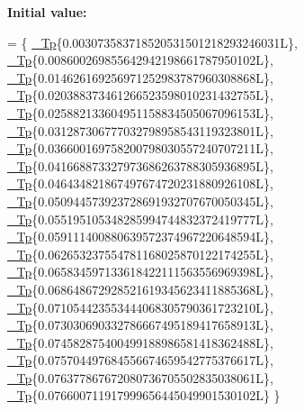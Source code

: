 {\bfseries Initial value\+:}
\begin{DoxyCode}
=
      \{
        \hyperlink{namespace____gnu__cxx_a3b19a9c800ca194374ef9172290f7d79}{\_Tp}\{0.003073583718520531501218293246031L\},
        \hyperlink{namespace____gnu__cxx_a3b19a9c800ca194374ef9172290f7d79}{\_Tp}\{0.008600269855642942198661787950102L\},
        \hyperlink{namespace____gnu__cxx_a3b19a9c800ca194374ef9172290f7d79}{\_Tp}\{0.014626169256971252983787960308868L\},
        \hyperlink{namespace____gnu__cxx_a3b19a9c800ca194374ef9172290f7d79}{\_Tp}\{0.020388373461266523598010231432755L\},
        \hyperlink{namespace____gnu__cxx_a3b19a9c800ca194374ef9172290f7d79}{\_Tp}\{0.025882133604951158834505067096153L\},
        \hyperlink{namespace____gnu__cxx_a3b19a9c800ca194374ef9172290f7d79}{\_Tp}\{0.031287306777032798958543119323801L\},
        \hyperlink{namespace____gnu__cxx_a3b19a9c800ca194374ef9172290f7d79}{\_Tp}\{0.036600169758200798030557240707211L\},
        \hyperlink{namespace____gnu__cxx_a3b19a9c800ca194374ef9172290f7d79}{\_Tp}\{0.041668873327973686263788305936895L\},
        \hyperlink{namespace____gnu__cxx_a3b19a9c800ca194374ef9172290f7d79}{\_Tp}\{0.046434821867497674720231880926108L\},
        \hyperlink{namespace____gnu__cxx_a3b19a9c800ca194374ef9172290f7d79}{\_Tp}\{0.050944573923728691932707670050345L\},
        \hyperlink{namespace____gnu__cxx_a3b19a9c800ca194374ef9172290f7d79}{\_Tp}\{0.055195105348285994744832372419777L\},
        \hyperlink{namespace____gnu__cxx_a3b19a9c800ca194374ef9172290f7d79}{\_Tp}\{0.059111400880639572374967220648594L\},
        \hyperlink{namespace____gnu__cxx_a3b19a9c800ca194374ef9172290f7d79}{\_Tp}\{0.062653237554781168025870122174255L\},
        \hyperlink{namespace____gnu__cxx_a3b19a9c800ca194374ef9172290f7d79}{\_Tp}\{0.065834597133618422111563556969398L\},
        \hyperlink{namespace____gnu__cxx_a3b19a9c800ca194374ef9172290f7d79}{\_Tp}\{0.068648672928521619345623411885368L\},
        \hyperlink{namespace____gnu__cxx_a3b19a9c800ca194374ef9172290f7d79}{\_Tp}\{0.071054423553444068305790361723210L\},
        \hyperlink{namespace____gnu__cxx_a3b19a9c800ca194374ef9172290f7d79}{\_Tp}\{0.073030690332786667495189417658913L\},
        \hyperlink{namespace____gnu__cxx_a3b19a9c800ca194374ef9172290f7d79}{\_Tp}\{0.074582875400499188986581418362488L\},
        \hyperlink{namespace____gnu__cxx_a3b19a9c800ca194374ef9172290f7d79}{\_Tp}\{0.075704497684556674659542775376617L\},
        \hyperlink{namespace____gnu__cxx_a3b19a9c800ca194374ef9172290f7d79}{\_Tp}\{0.076377867672080736705502835038061L\},
        \hyperlink{namespace____gnu__cxx_a3b19a9c800ca194374ef9172290f7d79}{\_Tp}\{0.076600711917999656445049901530102L\}
      \}
\end{DoxyCode}


